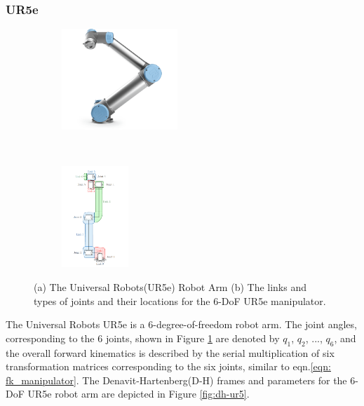 \subsubsection{UR5e}

\begin{figure}[t!]
    \centering
    \begin{subfigure}[t]{0.4\textwidth}
        \centering
        \includegraphics[height=1.5in]{figures/background/ur5e_overview.png}
    \end{subfigure}%
    ~ 
    \begin{subfigure}[t]{0.5\textwidth}
        \centering
        \includegraphics[height=1.5in]{figures/background/ur5e_links.png}
    \end{subfigure}
    \caption[Universal Robots(UR5e) Robot Arm]{(a) The Universal Robots(UR5e) Robot Arm (b) The links and types of joints and their locations for the 6-DoF UR5e manipulator.}
    \label{fig:ur5e}
\end{figure}

The Universal Robots UR5e is a 6-degree-of-freedom robot arm. The joint angles, corresponding to the 6 joints, shown in Figure \ref{fig:ur5e} are denoted by $q_1$, $q_2$, ..., $q_6$, and the overall forward kinematics is described by the serial multiplication of six transformation matrices corresponding to the six joints, similar to eqn.\ref{eqn: fk_manipulator}. The Denavit-Hartenberg(D-H) frames and parameters for the 6-DoF UR5e robot arm are depicted in Figure \ref{fig:dh-ur5}.

